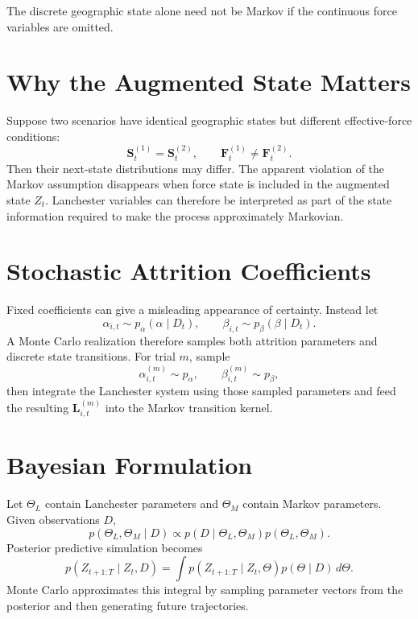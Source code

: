 \documentclass[11pt,letterpaper]{article}
\begin{document}
The discrete geographic state alone need not be Markov if the continuous force variables are omitted.

\section{Why the Augmented State Matters}
Suppose two scenarios have identical geographic states but different effective-force conditions:
\begin{equation}
\mathbf{S}_t^{(1)}=\mathbf{S}_t^{(2)},
\qquad
\mathbf{F}_t^{(1)}\neq\mathbf{F}_t^{(2)}.
\end{equation}
Then their next-state distributions may differ. The apparent violation of the Markov assumption disappears when force state is included in the augmented state $Z_t$. Lanchester variables can therefore be interpreted as part of the state information required to make the process approximately Markovian.

\section{Stochastic Attrition Coefficients}
Fixed coefficients can give a misleading appearance of certainty. Instead let
\begin{equation}
\alpha_{i,t}\sim p_{\alpha}(\alpha\mid D_t),
\qquad
\beta_{i,t}\sim p_{\beta}(\beta\mid D_t).
\end{equation}
A Monte Carlo realization therefore samples both attrition parameters and discrete state transitions. For trial $m$, sample
\begin{equation}
\alpha_{i,t}^{(m)}\sim p_{\alpha},
\qquad
\beta_{i,t}^{(m)}\sim p_{\beta},
\end{equation}
then integrate the Lanchester system using those sampled parameters and feed the resulting $\mathbf{L}_{i,t}^{(m)}$ into the Markov transition kernel.

\section{Bayesian Formulation}
Let $\Theta_L$ contain Lanchester parameters and $\Theta_M$ contain Markov parameters. Given observations $D$,
\begin{equation}
p(\Theta_L,\Theta_M\mid D)
\propto
p(D\mid\Theta_L,\Theta_M)p(\Theta_L,\Theta_M).
\end{equation}
Posterior predictive simulation becomes
\begin{equation}
p(Z_{t+1:T}\mid Z_t,D)
=
\int p(Z_{t+1:T}\mid Z_t,\Theta)p(\Theta\mid D)\,d\Theta.
\end{equation}
Monte Carlo approximates this integral by sampling parameter vectors from the posterior and then generating future trajectories.
\end{document}
